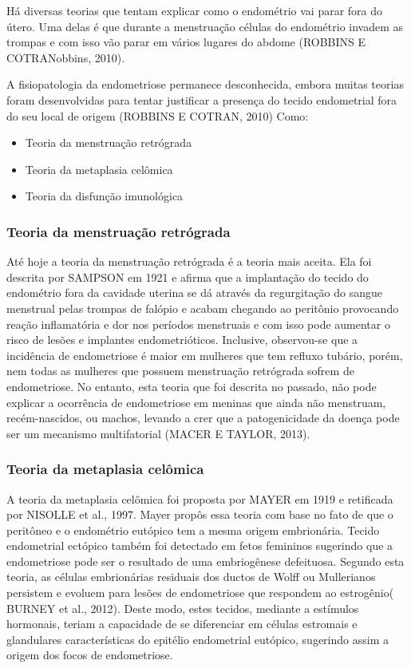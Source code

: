 \documentclass[12pt]{article} %
\begin{document}
Há diversas teorias que tentam explicar como o endométrio vai parar
fora do útero. Uma delas é que durante a menstruação células do
endométrio invadem as trompas e com isso vão parar em vários lugares
do abdome (ROBBINS E COTRANobbins, 2010).


A fisiopatologia da endometriose permanece desconhecida, embora muitas
teorias foram desenvolvidas para tentar justificar a presença do
tecido endometrial fora do seu local de origem (ROBBINS E COTRAN, 2010) Como:

\begin{itemize}
\item Teoria da menstruação retrógrada
\item Teoria da metaplasia celômica
\item Teoria da disfunção imunológica
\end{itemize}


\subsubsection{Teoria da menstruação retrógrada}

Até hoje a teoria da menstruação retrógrada é a teoria mais
aceita. Ela foi descrita por SAMPSON em 1921 e afirma que a
implantação do tecido do endométrio fora da cavidade uterina se dá
através da regurgitação do sangue menstrual pelas trompas de falópio e
acabam chegando ao peritônio provocando reação
inflamatória e dor nos períodos menstruais e com isso  pode aumentar o risco de lesões e implantes endometrióticos.  Inclusive, observou-se que
a incidência de endometriose é maior em mulheres que tem refluxo
tubário, porém, nem todas as mulheres que possuem menstruação
retrógrada sofrem de endometriose. No entanto, esta teoria que foi descrita no passado, não pode explicar a ocorrência de endometriose em meninas que ainda não menstruam, recém-nascidos, ou machos, levando a crer que a patogenicidade da doença pode ser um mecanismo multifatorial (MACER E TAYLOR, 2013).

\subsubsection{Teoria da metaplasia celômica}

A teoria da metaplasia celômica foi proposta por MAYER em 1919 e
retificada por NISOLLE et al., 1997. Mayer propôs essa teoria com base
no fato de que o peritôneo e o endométrio eutópico tem a mesma origem
embrionária. Tecido endometrial ectópico também foi detectado em fetos femininos sugerindo que a endometriose pode ser o resultado de uma embriogênese defeituosa. Segundo esta teoria, as células embrionárias residuais dos ductos de Wolff ou Mullerianos persistem e evoluem para lesões de endometriose que respondem ao estrogênio( BURNEY et al., 2012). Deste modo, estes tecidos, mediante a estímulos
hormonais, teriam a capacidade de se diferenciar em células estromais
e glandulares características do epitélio endometrial eutópico,
sugerindo assim a origem dos focos de endometriose.
\end{document}
